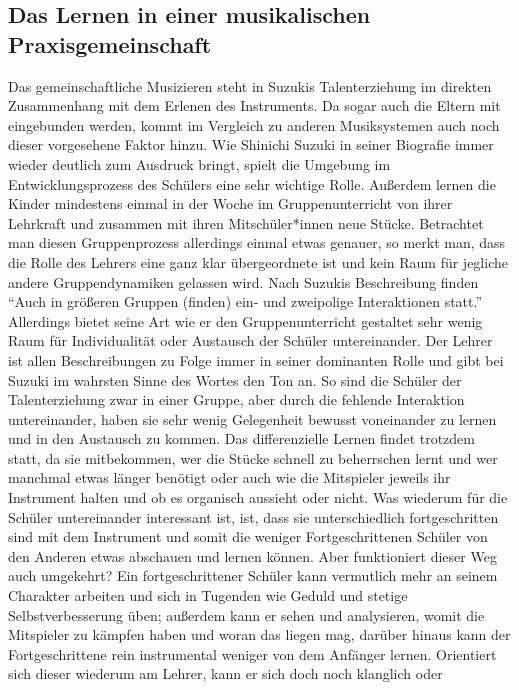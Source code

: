 \subsection{Das Lernen in einer musikalischen Praxisgemeinschaft}
Das gemeinschaftliche Musizieren steht in Suzukis Talenterziehung im direkten
Zusammenhang mit dem Erlenen des Instruments. Da sogar auch die Eltern mit
eingebunden werden, kommt im Vergleich zu anderen Musiksystemen auch noch dieser
vorgesehene Faktor hinzu. Wie Shinichi Suzuki in seiner Biografie immer wieder
deutlich zum Ausdruck bringt, spielt die Umgebung im Entwicklungsprozess des
Schülers eine sehr wichtige Rolle. Außerdem lernen die Kinder mindestens einmal
in der Woche im Gruppenunterricht von ihrer Lehrkraft und zusammen mit ihren
Mitschüler*innen neue Stücke. Betrachtet man diesen Gruppenprozess allerdings einmal
etwas genauer, so merkt man, dass die Rolle des Lehrers eine ganz klar
übergeordnete ist und kein Raum für jegliche andere Gruppendynamiken gelassen
wird. Nach Suzukis Beschreibung finden \enquote{Auch in größeren Gruppen (finden) ein-
und zweipolige Interaktionen statt.} \autocite[30]{suzuki:erziehung_ist_liebe}
Allerdings bietet seine Art wie er den Gruppenunterricht gestaltet sehr wenig
Raum für Individualität oder Austausch der Schüler untereinander. Der Lehrer ist
allen Beschreibungen zu Folge immer in seiner dominanten Rolle und gibt bei
Suzuki im wahrsten Sinne des Wortes den Ton an. So sind die Schüler der
Talenterziehung zwar in einer Gruppe, aber durch die fehlende Interaktion
untereinander, haben sie sehr wenig Gelegenheit bewusst voneinander zu lernen und
in den Austausch zu kommen. Das differenzielle Lernen findet trotzdem statt, da
sie mitbekommen, wer die Stücke schnell zu beherrschen lernt und wer manchmal
etwas länger benötigt oder auch wie die Mitspieler jeweils ihr Instrument halten
und ob es organisch aussieht oder nicht. Was wiederum für die Schüler
untereinander interessant ist, ist, dass sie unterschiedlich fortgeschritten
sind mit dem Instrument und somit die weniger Fortgeschrittenen Schüler von den
Anderen etwas abschauen und lernen können. Aber funktioniert dieser Weg auch
umgekehrt? Ein fortgeschrittener Schüler kann vermutlich mehr an seinem
Charakter arbeiten und sich in Tugenden wie Geduld und stetige
Selbstverbesserung üben; außerdem kann er sehen und analysieren, womit die
Mitspieler zu kämpfen haben und woran das liegen mag, darüber hinaus kann
der Fortgeschrittene rein instrumental weniger von dem Anfänger lernen.
Orientiert sich dieser wiederum am Lehrer, kann er sich doch noch klanglich oder
